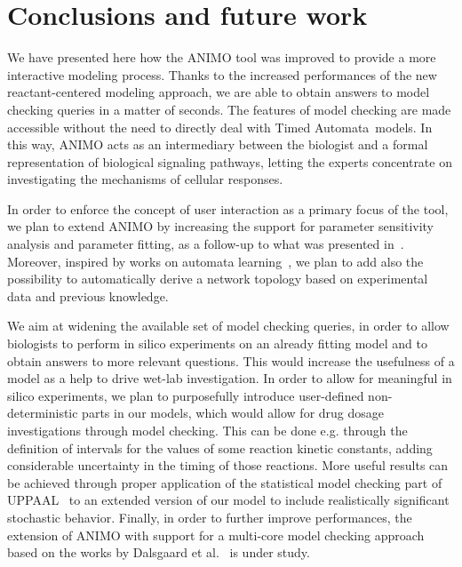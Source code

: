 \documentclass{llncs}
\newcommand{\tas}{Timed Automata}
\begin{document}
\section{Conclusions and future work}\label{sec:conclusion}
We have presented here how the ANIMO tool 
was improved to provide a more interactive modeling process.
Thanks to the increased performances of the new reactant-centered modeling approach,
we are able to obtain answers to model checking queries in a matter of seconds.
The features
of model checking are made accessible without the need to directly deal with \tas\ models.
In this way, ANIMO acts as an intermediary between the biologist and a formal
representation of biological signaling pathways, letting the experts concentrate
on investigating the mechanisms of cellular responses.

In order to enforce the concept of user interaction as a primary focus of the tool, we plan to extend
ANIMO by increasing the support for parameter sensitivity analysis and parameter fitting,
as a follow-up to what was presented in~\cite{animo-syncop}.
Moreover, inspired by works on automata learning~\cite{test-based-modelling}, we plan to add also the possibility
to automatically derive a network topology based on experimental data and 
previous knowledge.

We aim at widening the available set of model checking queries, in order to allow biologists to perform
in silico experiments on an already fitting model and to obtain answers to more relevant questions.
This would increase the usefulness of a model as a help to drive wet-lab investigation.
In order to allow for meaningful in silico experiments, we plan to purposefully introduce user-defined non-deterministic 
parts in our models, which would allow for drug dosage investigations through model checking.
This can be done e.g. through the definition of intervals for the values of some reaction kinetic constants,
adding considerable uncertainty in the timing of those reactions.
More useful results can be achieved through proper application of the statistical model checking part of UPPAAL~\cite{uppaal-smc} to
an extended version of our model to include realistically significant stochastic behavior.
Finally, in order to further improve performances, the extension of ANIMO with support for a multi-core model checking approach based on the
works by Dalsgaard et al.~\cite{uppaal-multi-core1}
is under study.





\end{document}

